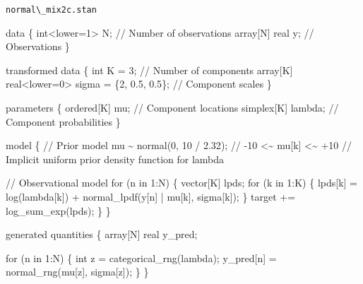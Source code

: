 \documentclass[
  letterpaper,
  DIV=11,
  numbers=noendperiod]{scrartcl}
\newenvironment{Shaded}{\begin{snugshade}}{\end{snugshade}}
\newcommand{\CommentTok}[1]{\textcolor[rgb]{0.37,0.37,0.37}{#1}}
\newcommand{\ControlFlowTok}[1]{\textcolor[rgb]{0.00,0.23,0.31}{#1}}
\newcommand{\DataTypeTok}[1]{\textcolor[rgb]{0.68,0.00,0.00}{#1}}
\newcommand{\DecValTok}[1]{\textcolor[rgb]{0.68,0.00,0.00}{#1}}
\newcommand{\FloatTok}[1]{\textcolor[rgb]{0.68,0.00,0.00}{#1}}
\newcommand{\KeywordTok}[1]{\textcolor[rgb]{0.00,0.23,0.31}{#1}}
\newcommand{\NormalTok}[1]{\textcolor[rgb]{0.00,0.23,0.31}{#1}}
\begin{document}
\begin{codelisting}

\caption{\texttt{normal\textbackslash\_mix2c.stan}}

\begin{Shaded}
\begin{Highlighting}[]
\KeywordTok{data}\NormalTok{ \{}
  \DataTypeTok{int}\NormalTok{\textless{}}\KeywordTok{lower}\NormalTok{=}\DecValTok{1}\NormalTok{\textgreater{} N;  }\CommentTok{// Number of observations}
  \DataTypeTok{array}\NormalTok{[N] }\DataTypeTok{real}\NormalTok{ y; }\CommentTok{// Observations}
\NormalTok{\}}

\KeywordTok{transformed data}\NormalTok{ \{}
  \DataTypeTok{int}\NormalTok{ K = }\DecValTok{3}\NormalTok{;                                    }\CommentTok{// Number of components}
  \DataTypeTok{array}\NormalTok{[K] }\DataTypeTok{real}\NormalTok{\textless{}}\KeywordTok{lower}\NormalTok{=}\DecValTok{0}\NormalTok{\textgreater{} sigma = \{}\DecValTok{2}\NormalTok{, }\FloatTok{0.5}\NormalTok{, }\FloatTok{0.5}\NormalTok{\}; }\CommentTok{// Component scales}
\NormalTok{\}}

\KeywordTok{parameters}\NormalTok{ \{}
  \DataTypeTok{ordered}\NormalTok{[K] mu;     }\CommentTok{// Component locations}
  \DataTypeTok{simplex}\NormalTok{[K] lambda; }\CommentTok{// Component probabilities}
\NormalTok{\}}

\KeywordTok{model}\NormalTok{ \{}
  \CommentTok{// Prior model}
\NormalTok{  mu \textasciitilde{} normal(}\DecValTok{0}\NormalTok{, }\DecValTok{10}\NormalTok{ / }\FloatTok{2.32}\NormalTok{); }\CommentTok{// {-}10 \textless{}\textasciitilde{} mu[k] \textless{}\textasciitilde{} +10}
  \CommentTok{// Implicit uniform prior density function for lambda}

  \CommentTok{// Observational model}
  \ControlFlowTok{for}\NormalTok{ (n }\ControlFlowTok{in} \DecValTok{1}\NormalTok{:N) \{}
    \DataTypeTok{vector}\NormalTok{[K] lpds;}
    \ControlFlowTok{for}\NormalTok{ (k }\ControlFlowTok{in} \DecValTok{1}\NormalTok{:K) \{}
\NormalTok{      lpds[k] = log(lambda[k]) + normal\_lpdf(y[n] | mu[k], sigma[k]);}
\NormalTok{    \}}
    \KeywordTok{target +=}\NormalTok{ log\_sum\_exp(lpds);}
\NormalTok{  \}}
\NormalTok{\}}

\KeywordTok{generated quantities}\NormalTok{ \{}
  \DataTypeTok{array}\NormalTok{[N] }\DataTypeTok{real}\NormalTok{ y\_pred;}

  \ControlFlowTok{for}\NormalTok{ (n }\ControlFlowTok{in} \DecValTok{1}\NormalTok{:N) \{}
    \DataTypeTok{int}\NormalTok{ z = categorical\_rng(lambda);}
\NormalTok{    y\_pred[n] = normal\_rng(mu[z], sigma[z]);}
\NormalTok{  \}}
\NormalTok{\}}
\end{Highlighting}
\end{Shaded}

\end{codelisting}
\end{document}
